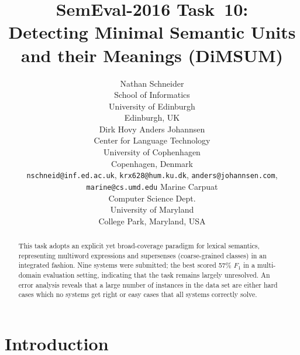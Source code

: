\documentclass[11pt,letterpaper]{article}
\title{SemEval-2016 Task~10:\\ Detecting Minimal Semantic Units and their Meanings (DiMSUM)}
\author{
Nathan Schneider \\
		School of Informatics\\
	   	University of Edinburgh\\
	    Edinburgh, UK\\ %
	\And
Dirk Hovy \quad Anders Johannsen\\
Center for Language Technology\\
University of Cophenhagen\\
Copenhagen, Denmark\\
{\tt nschneid@inf.ed.ac.uk}, {\tt krx628@hum.ku.dk}, {\tt anders@johannsen.com}, {\tt marine@cs.umd.edu} 
    \And
Marine Carpuat\\
Computer Science Dept.\\
University of Maryland\\
College Park, Maryland, USA\\ %
}
\date{}
\newcommand{\ensuretext}[1]{#1}
\newcommand{\nssmarker}{\ensuretext{\textcolor{magenta}{\ensuremath{^{\textsc{NS}}_{\textsc{S}}}}}}
\newcommand{\dhmarker}{\ensuretext{\textcolor{red}{\ensuremath{^{\textsc{D}}_{\textsc{H}}}}}}
\newcommand{\arkcomment}[3]{\ensuretext{\textcolor{#3}{[#1 #2]}}}
\newcommand{\nss}[1]{\arkcomment{\nssmarker}{#1}{magenta}}
\newcommand{\dirk}[1]{\arkcomment{\dhmarker}{#1}{red}}
\newcommand{\longversion}[1]{#1} %
\begin{document}
\naaclfinalcopy %
\maketitle

\begin{abstract}
This task adopts an explicit yet broad-coverage paradigm for lexical semantics, representing
multiword expressions and supersenses (coarse-grained classes) in an integrated fashion.
Nine systems were submitted; the best scored 57\% $F_1$ in a multi-domain evaluation setting, 
indicating that the task remains largely unresolved. 
An error analysis reveals that a large number of instances in the data set are either hard cases 
which no systems get right or easy cases that all systems correctly solve.
\end{abstract}

\section{Introduction}\label{sec:intro}


\end{document}
